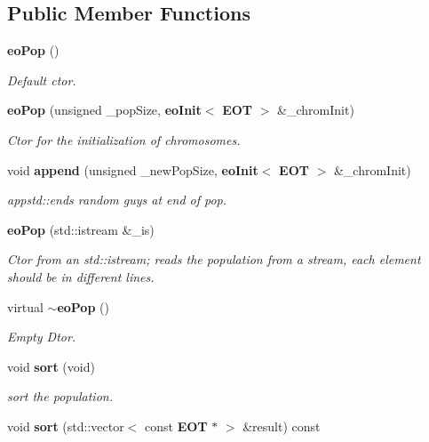 \subsection*{Public Member Functions}
\begin{CompactItemize}
\item 
{\bf eo\-Pop} ()
\begin{CompactList}\small\item\em Default ctor. \item\end{CompactList}\item 
{\bf eo\-Pop} (unsigned \_\-pop\-Size, {\bf eo\-Init}$<$ {\bf EOT} $>$ \&\_\-chrom\-Init)
\begin{CompactList}\small\item\em Ctor for the initialization of chromosomes. \item\end{CompactList}\item 
void {\bf append} (unsigned \_\-new\-Pop\-Size, {\bf eo\-Init}$<$ {\bf EOT} $>$ \&\_\-chrom\-Init)
\begin{CompactList}\small\item\em appstd::ends random guys at end of pop. \item\end{CompactList}\item 
{\bf eo\-Pop} (std::istream \&\_\-is)
\begin{CompactList}\small\item\em Ctor from an std::istream; reads the population from a stream, each element should be in different lines. \item\end{CompactList}\item 
virtual {\bf $\sim$eo\-Pop} ()\label{classeo_pop_a4}

\begin{CompactList}\small\item\em Empty Dtor. \item\end{CompactList}\item 
void {\bf sort} (void)
\begin{CompactList}\small\item\em sort the population. \item\end{CompactList}\item 
void {\bf sort} (std::vector$<$ const {\bf EOT} $\ast$ $>$ \&result) const \label{classeo_pop_a6}


\end{CompactItemize}
